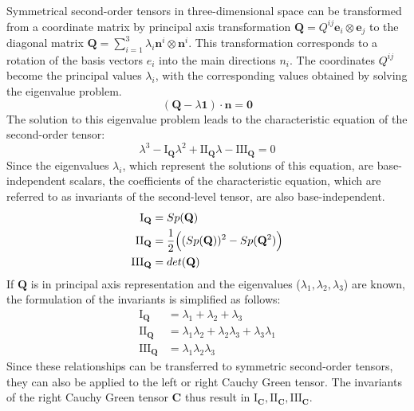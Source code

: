 \documentclass[preprint,12pt,authoryear]{elsarticle}
\begin{document}
Symmetrical second-order tensors in three-dimensional space can be transformed from a coordinate matrix by principal axis transformation $\mathbf{Q}=Q^{ij}\mathbf{e}_{i}\otimes\mathbf{e}_{j}$ to the diagonal matrix $\mathbf{Q}=\sum_{i=1}^{3}\lambda_{i}\mathbf{n}^{i}\otimes\mathbf{n}^{i}$. This transformation corresponds to a rotation of the basis vectors $e_{i}$ into the main directions $n_{i}$. The coordinates $Q^{ij}$ become the principal values $\lambda_{i}$, with the corresponding values obtained by solving the eigenvalue problem.
\begin{equation}
	\label{eq.: Eigenvalueproblem}
	(\mathbf{Q}-\lambda\mathbf{1})\cdot \mathbf{n}=\mathbf{0}
\end{equation}
The solution to this eigenvalue problem leads to the characteristic equation of the second-order tensor:
\begin{equation}
	\label{eq.: characteristic equation}
	\lambda^{3}-\mathrm{I}_{\mathbf{Q}}\lambda^{2}+\mathrm{II}_{\mathbf{Q}}\lambda-\mathrm{III}_{\mathbf{Q}}=0
\end{equation}
Since the eigenvalues $\lambda_{i}$, which represent the solutions of this equation, are base-independent scalars, the coefficients of the characteristic equation, which are referred to as invariants of the second-level tensor, are also base-independent.
\begin{align}
	\label{eq.: Ivariants of arbitrary second order tensor}
	\mathrm{I}_{\mathbf{Q}}&=Sp(\mathbf{Q})\\
	\mathrm{II}_{\mathbf{Q}}&=\frac{1}{2}\Bigl((Sp(\mathbf{Q}))^{2}-Sp(\mathbf{Q}^{2})\Bigr)\\
	\mathrm{III}_{\mathbf{Q}}&=det(\mathbf{Q})
\end{align}
If $\mathbf{Q}$ is in principal axis representation and the eigenvalues ($\lambda_{1},\lambda_{2},\lambda_{3}$) are known, the formulation of the invariants is simplified as follows:
\begin{align}
	\label{eq.: Ivariants of known eigenvalues}
	\mathrm{I}_{\mathbf{Q}}&=\lambda_{1}+\lambda_{2}+\lambda_{3}\\
	\mathrm{II}_{\mathbf{Q}}&=\lambda_{1}\lambda_{2}+\lambda_{2}\lambda_{3}+\lambda_{3}\lambda_{1}\\
	\mathrm{III}_{\mathbf{Q}}&=\lambda_{1}\lambda_{2}\lambda_{3}
\end{align}
Since these relationships can be transferred to symmetric second-order tensors, they can also be applied to the left or right Cauchy Green tensor. The invariants of the right Cauchy Green tensor $\mathbf{C}$ thus result in $\mathrm{I}_{\mathbf{C}}, \mathrm{II}_{\mathbf{C}}, \mathrm{III}_{\mathbf{C}}$.
\end{document}
